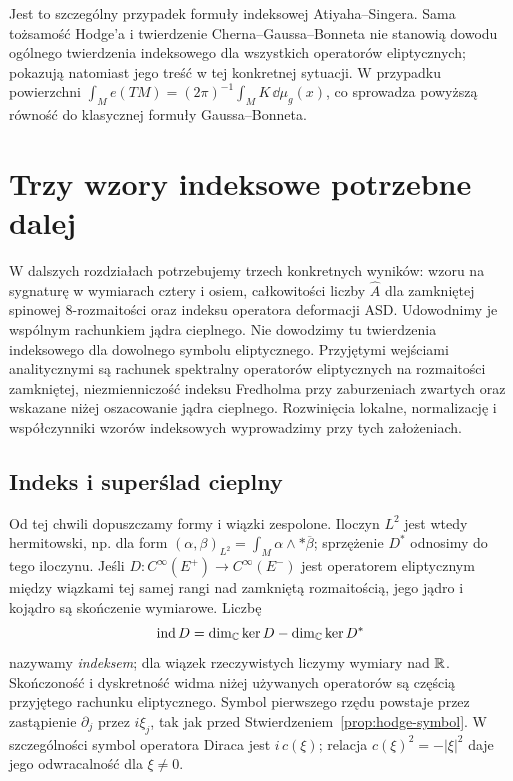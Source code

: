 Jest to szczególny przypadek formuły indeksowej
Atiyaha--Singera. Sama tożsamość Hodge'a i twierdzenie
Cherna--Gaussa--Bonneta nie stanowią dowodu ogólnego
twierdzenia indeksowego dla wszystkich operatorów
eliptycznych; pokazują natomiast jego treść w tej
konkretnej sytuacji. W przypadku powierzchni
$\int_M e(TM)=(2\pi)^{-1}\int_M K\,\dd\mu_g(x)$, co sprowadza
powyższą równość do klasycznej formuły Gaussa--Bonneta.


\section{Trzy wzory indeksowe potrzebne dalej}
\label{sec:hodge-indeks}

W dalszych rozdziałach potrzebujemy trzech konkretnych
wyników: wzoru na sygnaturę w wymiarach cztery i osiem,
całkowitości liczby \(\widehat A\) dla zamkniętej spinowej
\(8\)-rozmaitości oraz indeksu operatora deformacji ASD.
Udowodnimy je wspólnym rachunkiem jądra cieplnego.
Nie dowodzimy tu twierdzenia indeksowego dla dowolnego
symbolu eliptycznego.
Przyjętymi wejściami analitycznymi są rachunek spektralny
operatorów eliptycznych na rozmaitości zamkniętej,
niezmienniczość indeksu Fredholma przy zaburzeniach zwartych
oraz wskazane niżej oszacowanie jądra cieplnego.
Rozwinięcia lokalne, normalizację i współczynniki
wzorów indeksowych wyprowadzimy przy tych założeniach.

\subsection*{Indeks i superślad cieplny}

Od tej chwili dopuszczamy formy i wiązki zespolone.
Iloczyn $L^2$ jest wtedy hermitowski, np. dla form
$(\alpha,\beta)_{L^2}=\int_M\alpha\wedge*\overline\beta$;
sprzężenie $D^*$ odnosimy do tego iloczynu.
Jeśli \(D:C^\infty(E^+)\to C^\infty(E^-)\) jest operatorem
eliptycznym między wiązkami tej samej rangi nad
zamkniętą rozmaitością, jego jądro i kojądro są
skończenie wymiarowe. Liczbę
\[
 \operatorname{ind}D
 =\dim_{\mathbb{C}}\ker D-\dim_{\mathbb{C}}\ker D^*
\]
nazywamy \emph{indeksem}; dla wiązek rzeczywistych
liczymy wymiary nad \(\mathbb{R}\). Skończoność i dyskretność
widma niżej używanych operatorów są częścią
przyjętego rachunku eliptycznego. Symbol pierwszego
rzędu powstaje przez zastąpienie \(\partial_j\) przez
\(i\xi_j\), tak jak przed
Stwierdzeniem~\ref{prop:hodge-symbol}. W szczególności
symbol operatora Diraca jest \(i\,c(\xi)\); relacja
\(c(\xi)^2=-|\xi|^2\) daje jego odwracalność dla
\(\xi\ne0\).

